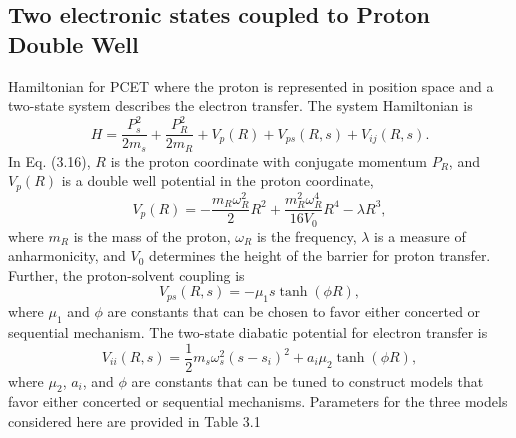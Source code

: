 \documentclass[phd,tocprelim]{cornell}
\begin{document}
\subsection{Two electronic states coupled to Proton Double Well}
Hamiltonian for PCET
where the proton is represented in 
position space and a two-state system
describes the electron 
transfer.
The system Hamiltonian is 
\begin{equation}
\label{eq:systemham} H
=\frac{P_{s}^2}{2m_{s}}
+\frac{P_{R}^2}{2m_{R}} + V_{p}(R) +
V_{ps}(R,s) + V_{ij}(R,s). 
\end{equation}
In Eq. (3.16), $R$ is
the proton coordinate with conjugate
momentum $P_R$, and 
$V_p (R)$ is a double well potential
in the proton coordinate,
\begin{equation}
\label{eq:protpot} V_{p}(R) =
-\frac{m_R\omega_R^2}{2}R^2 +
\frac{m_R^2\omega_R^4}{16V_0}R^4 -
\lambda R^3, \end{equation}
where $m_R$ is the mass of the proton,
$\omega_R$ is the frequency, $\lambda$ is 
a measure of anharmonicity, and $V_0$
determines the height of the barrier for
proton transfer.
Further, the proton-solvent coupling is
\begin{equation}
\label{eq:solcoup} V_{ps}
    (R,s) = -\mu_1 s \tanh (\phi R),
\end{equation}  
where $\mu_1$ and $\phi$ are constants 
that can be chosen to favor either 
concerted or sequential mechanism.
The two-state diabatic potential for 
electron transfer is 
\begin{equation} 
\label{eq:diabat2}
V_{ii}(R,s) = \frac{1}{2}m_s\omega_s^2(s
- s_i)^2 +a_i \mu_2 \tanh (\phi R),
\end{equation} where $\mu_2$, $a_i$, and
$\phi$ are constants that can be tuned 
to construct models that favor either concerted or 
sequential mechanisms. Parameters for the three
models considered here are provided in 
Table 3.1
\\
\end{document}
